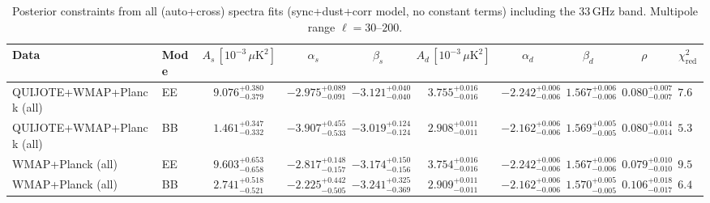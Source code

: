 \begin{table}[h]
\centering
\scriptsize
\setlength{\tabcolsep}{4pt}
\caption{Posterior constraints from all (auto+cross) spectra fits (sync+dust+corr model, no constant terms) including the 33\,GHz band. Multipole range $\ell=30$--$200$.}
\label{tab:fit_results_all_with33_sync_dust_cross}
\begin{tabular}{llcccccccc}
\toprule
Data & Mode & $A_s\,[10^{-3}\,\mu\mathrm{K}^2]$ & $\alpha_s$ & $\beta_s$ & $A_d\,[10^{-3}\,\mu\mathrm{K}^2]$ & $\alpha_d$ & $\beta_d$ & $\rho$ & $\chi^2_\mathrm{red}$ \\
\midrule
QUIJOTE+WMAP+Planck (all) & EE & $9.076^{+0.380}_{-0.379}$ & $-2.975^{+0.089}_{-0.091}$ & $-3.121^{+0.040}_{-0.040}$ & $3.755^{+0.016}_{-0.016}$ & $-2.242^{+0.006}_{-0.006}$ & $1.567^{+0.006}_{-0.006}$ & $0.080^{+0.007}_{-0.007}$ & $7.62$ \\
QUIJOTE+WMAP+Planck (all) & BB & $1.461^{+0.347}_{-0.332}$ & $-3.907^{+0.455}_{-0.533}$ & $-3.019^{+0.124}_{-0.124}$ & $2.908^{+0.011}_{-0.011}$ & $-2.162^{+0.006}_{-0.006}$ & $1.569^{+0.005}_{-0.005}$ & $0.080^{+0.014}_{-0.014}$ & $5.31$ \\
WMAP+Planck (all) & EE & $9.603^{+0.653}_{-0.658}$ & $-2.817^{+0.148}_{-0.157}$ & $-3.174^{+0.150}_{-0.156}$ & $3.754^{+0.016}_{-0.016}$ & $-2.242^{+0.006}_{-0.006}$ & $1.567^{+0.006}_{-0.006}$ & $0.079^{+0.010}_{-0.010}$ & $9.56$ \\
WMAP+Planck (all) & BB & $2.741^{+0.518}_{-0.521}$ & $-2.225^{+0.442}_{-0.505}$ & $-3.241^{+0.325}_{-0.369}$ & $2.909^{+0.011}_{-0.011}$ & $-2.162^{+0.006}_{-0.006}$ & $1.570^{+0.005}_{-0.005}$ & $0.106^{+0.018}_{-0.017}$ & $6.41$ \\
\bottomrule
\end{tabular}
\end{table}
